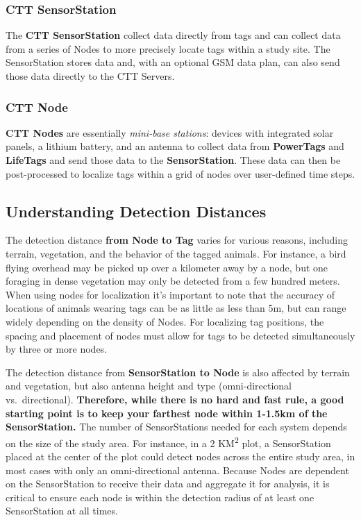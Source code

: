 \documentclass[
]{article}
\begin{document}
\hypertarget{ctt-sensorstation}{%
\subsubsection{CTT SensorStation}\label{ctt-sensorstation}}

The \textbf{CTT SensorStation} collect data directly from tags and can
collect data from a series of Nodes to more precisely locate tags within
a study site. The SensorStation stores data and, with an optional GSM
data plan, can also send those data directly to the CTT Servers.

\hypertarget{ctt-node}{%
\subsubsection{CTT Node}\label{ctt-node}}

\textbf{CTT Nodes} are essentially \emph{mini-base stations}: devices
with integrated solar panels, a lithium battery, and an antenna to
collect data from \textbf{PowerTags} and \textbf{LifeTags} and send
those data to the \textbf{SensorStation}. These data can then be
post-processed to localize tags within a grid of nodes over user-defined
time steps.

\hypertarget{understanding-detection-distances}{%
\subsection{Understanding Detection
Distances}\label{understanding-detection-distances}}

The detection distance \textbf{from Node to Tag} varies for various
reasons, including terrain, vegetation, and the behavior of the tagged
animals. For instance, a bird flying overhead may be picked up over a
kilometer away by a node, but one foraging in dense vegetation may only
be detected from a few hundred meters. When using nodes for localization
it's important to note that the accuracy of locations of animals wearing
tags can be as little as less than 5m, but can range widely depending on
the density of Nodes. For localizing tag positions, the spacing and
placement of nodes must allow for tags to be detected simultaneously by
three or more nodes.

The detection distance from \textbf{SensorStation to Node} is also
affected by terrain and vegetation, but also antenna height and type
(omni-directional vs.~directional). \textbf{Therefore, while there is no
hard and fast rule, a good starting point is to keep your farthest node
within 1-1.5km of the SensorStation.} The number of SensorStations
needed for each system depends on the size of the study area. For
instance, in a 2 KM\textsuperscript{2} plot, a SensorStation placed at
the center of the plot could detect nodes across the entire study area,
in most cases with only an omni-directional antenna. Because Nodes are
dependent on the SensorStation to receive their data and aggregate it
for analysis, it is critical to ensure each node is within the detection
radius of at least one SensorStation at all times.
\end{document}
